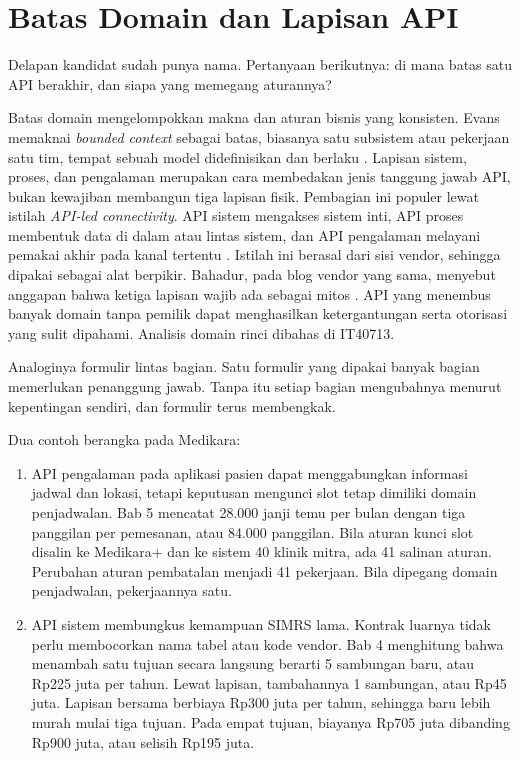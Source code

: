 \section{Batas Domain dan Lapisan API}

Delapan kandidat sudah punya nama. Pertanyaan berikutnya: di mana batas satu API berakhir, dan siapa yang memegang aturannya?

Batas domain mengelompokkan makna dan aturan bisnis yang konsisten. Evans memaknai \textit{bounded context} sebagai batas,
biasanya satu subsistem atau pekerjaan satu tim, tempat sebuah model didefinisikan dan berlaku \cite{c08-evans2015}. Lapisan
sistem, proses, dan pengalaman merupakan cara membedakan jenis tanggung jawab API, bukan kewajiban membangun tiga lapisan
fisik. Pembagian ini populer lewat istilah \textit{API-led connectivity}. API sistem mengakses sistem inti, API proses
membentuk data di dalam atau lintas sistem, dan API pengalaman melayani pemakai akhir pada kanal tertentu
\cite{c08-choudhary2023}. Istilah ini berasal dari sisi vendor, sehingga dipakai sebagai alat berpikir. Bahadur, pada blog
vendor yang sama, menyebut anggapan bahwa ketiga lapisan wajib ada sebagai mitos \cite{c08-bahadur2020}. API yang menembus
banyak domain tanpa pemilik dapat menghasilkan ketergantungan serta otorisasi yang sulit dipahami. Analisis domain rinci
dibahas di IT40713.

Analoginya formulir lintas bagian. Satu formulir yang dipakai banyak bagian memerlukan penanggung jawab. Tanpa itu setiap
bagian mengubahnya menurut kepentingan sendiri, dan formulir terus membengkak.

Dua contoh berangka pada Medikara:
\begin{enumerate}
  \item API pengalaman pada aplikasi pasien dapat menggabungkan informasi jadwal dan lokasi, tetapi keputusan mengunci slot
        tetap dimiliki domain penjadwalan. Bab 5 mencatat 28.000 janji temu per bulan dengan tiga panggilan per pemesanan,
        atau 84.000 panggilan. Bila aturan kunci slot disalin ke Medikara+ dan ke sistem 40 klinik mitra, ada 41 salinan
        aturan. Perubahan aturan pembatalan menjadi 41 pekerjaan. Bila dipegang domain penjadwalan, pekerjaannya satu.
  \item API sistem membungkus kemampuan SIMRS lama. Kontrak luarnya tidak perlu membocorkan nama tabel atau kode vendor. Bab
        4 menghitung bahwa menambah satu tujuan secara langsung berarti 5 sambungan baru, atau Rp225 juta per tahun. Lewat
        lapisan, tambahannya 1 sambungan, atau Rp45 juta. Lapisan bersama berbiaya Rp300 juta per tahun, sehingga baru lebih
        murah mulai tiga tujuan. Pada empat tujuan, biayanya Rp705 juta dibanding Rp900 juta, atau selisih Rp195 juta.
\end{enumerate}

